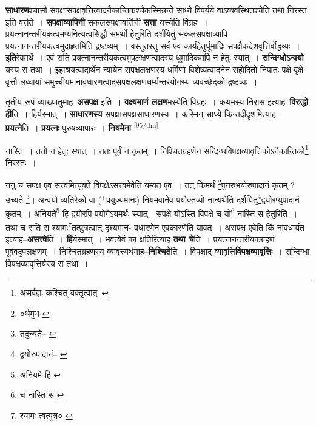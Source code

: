 \documentclass[article,12pt,a4paper]{memoir}
\newcommand{\add}[1]{($^{+}$#1)}
\begin{document}
	  \pstart \textbf{साधारण}श्चासौ सपक्षासपक्षवृत्तित्वादनैकान्तिकश्चैकस्मिन्नन्ते साध्ये विपर्यये वाऽव्यवस्थितश्चेति तथा निरस्त इति वर्त्तते । \textbf{सपक्षाव्यापिनी} सकलसपक्षावर्त्तिनी \textbf{सत्ता} यस्येति विग्रहः । प्रयत्नानन्तरीयकत्वमप्यनित्यत्वसिद्धौ समर्थो हेतुरिति दर्शयितुं सकलसपक्षाव्यापि प्रयत्नानन्तरीयकत्वमुदाहृतमिति द्रष्टव्यम् । वस्तुतस्तु सर्व एव कार्यहेतुर्धूमादिः सपक्षैकदेशवृत्तिर्बोद्धव्यः । \textbf{इति}रेवमर्थे । एवं सति प्रयत्नानन्तरीयकत्वमुपलक्षणत्वादस्य धूमादिकमपि न हेतुः स्यात् । \textbf{सन्दिग्धोऽन्वयो} यस्य स तथा । इहाश्रयत्वादार्थेन न्यायेन सपक्षलक्षणस्य धर्मिणो विशेष्यत्वादनेन सहोदितो निपातः पक्षे वृक्षे वृत्तौ लब्धायां समुच्चीयमानावधारणत्वादसपक्षलक्षणधर्म्यन्तरयोगस्य व्यवच्छेदको द्रष्टव्यः ।
	\pend
      

	  \pstart तृतीयं रूपं व्याख्यातुमाह--\textbf{असपक्ष} इति । \textbf{वक्ष्यमाणं लक्षण}मस्येति विग्रहः । कथमस्य निरास इत्याह--\textbf{विरुद्धो ही}ति । हिर्यस्मात् । \textbf{साधारणस्य} सपक्षासपक्षसाधारणस्य । कस्मिन् साध्ये किन्तदीदृशमित्याह--\textbf{प्रयत्ने}ति । \textbf{प्रयत्नः} पुरुषव्यापारः । \textbf{नियमेना}  \leavevmode\textsuperscript{\rmlatinfont\tiny [95/dm]} 
	  
	नास्ति । ततो न हेतुः स्यात् । ततः पूर्वं न कृतम् । निश्चितग्रहणेन सन्दिग्धविपक्षव्यावृत्तिकोऽनैकान्तिको\footnote{असर्वज्ञः कश्चित् वक्तृत्वात्--\cite{dp-msD-n}} निरस्तः । 
	  
	ननु च सपक्ष एव सत्त्वमित्युक्ते विपक्षेऽसत्त्वमेवेति यम्यत एव । तत् किमर्थं \footnote{०र्थमुभ \cite{dp-msC} \cite{dp-msD}}पुनरुभयोरुपादानं कृतम् ? उच्यते \footnote{तदुच्यते--\cite{dp-msA} \cite{dp-edP} \cite{dp-edH} \cite{dp-edE}}। अन्वयो व्यतिरेको वा \add{प्रयुज्यमानः} नियमवानेव प्रयोक्तव्यो नान्यथेति दर्शयितुं\footnote{द्वयोरुपादानं--\cite{dp-msB} \cite{dp-msC} \cite{dp-msD}}द्वयोरप्युपादानं कृतम् । अनियते\footnote{अनियमे हि \cite{dp-msA} \cite{dp-edP} \cite{dp-edH} \cite{dp-edE} \cite{dp-edN}} हि द्वयोरपि प्रयोगेऽयमर्थः स्यात्—सपक्षे योऽस्ति विपक्षे च यो\footnote{च नास्ति स \cite{dp-msA} \cite{dp-msB} \cite{dp-msD} \cite{dp-edP} \cite{dp-edH} \cite{dp-edE} \cite{dp-edN}} नास्ति स हेतुरिति । तथा च सति स श्यामः\footnote{श्यामः त्वत्पुत्र० \cite{dp-msC}}तत्पुत्रत्वात् दृश्यमान- वधारणेन एवकारणेति यावत् । असपक्ष एवेति किं नावधार्यत इत्याह--\textbf{असत्त्वे}ति । \textbf{हि}र्यस्मात् । भवत्वेवं का क्षतिरित्याह \textbf{तथा चे}ति । प्रयत्नानन्तरीयकग्रहणं पूर्ववदुपलक्षणम् । निश्चितग्रहणस्य व्यावृत्त्यर्थमाह--\textbf{निश्चिते}ति । विपक्षाद् व्यावृत्ति\textbf{र्विपक्षव्यावृत्तिः} । सन्दिग्धा विपक्षव्यावृत्तिर्यस्य स तथा ।
	\pend
      
\end{document}
